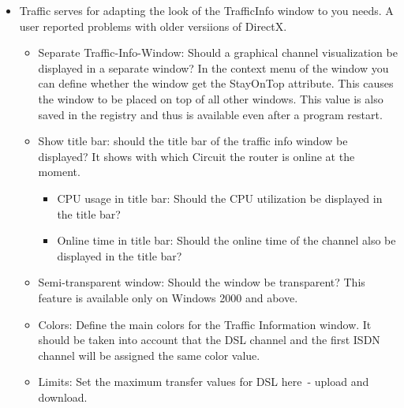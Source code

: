 \begin{itemize}
  \item Traffic serves for adapting the look of the TrafficInfo window to you needs.
    A user reported problems with older versiions of DirectX.
    \begin{itemize}
      \item Separate Traffic-Info-Window: Should a graphical channel visualization
      be displayed in a separate window? In the context menu of the window you
      can define whether the window get the StayOnTop attribute. This causes the window
        to be placed on top of all other windows. This value is also saved in the
        registry and thus is available even after a program restart.
      \item Show title bar: should the title bar of the traffic info window be
      displayed? It shows with which Circuit the router is online at the moment.
        \begin{itemize}
          \item CPU usage in title bar: Should the CPU utilization be displayed
          in the title bar?
          \item Online time in title bar: Should the online time of the channel also
             be displayed in the title bar?
        \end{itemize}
      \item Semi-transparent window: Should the window be transparent? This feature
      is available only on Windows 2000 and above.
      \item Colors: Define the main colors for the Traffic Information window. It
      should be taken into account that the DSL channel and the first ISDN channel
      will be assigned the same color value.
      \item Limits: Set the maximum transfer values for DSL here~- upload and download.
    \end{itemize}


\end{itemize}
